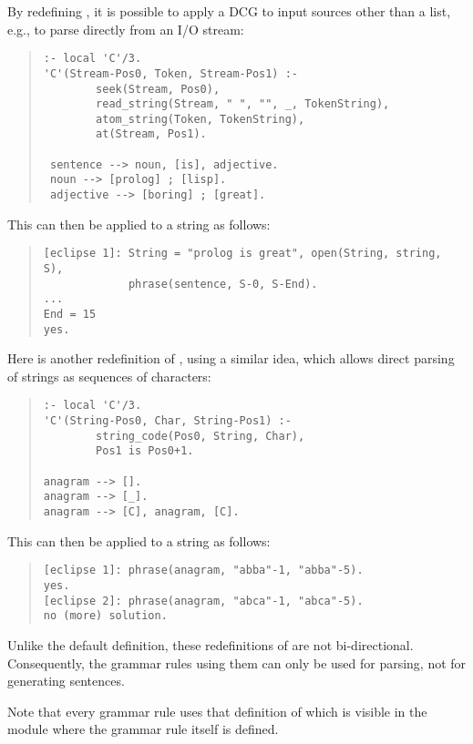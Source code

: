 By redefining , it is possible to apply a DCG to
input sources other than a list, e.g., to parse directly from an I/O stream:
\begin{quote}
\begin{verbatim}
:- local 'C'/3.
'C'(Stream-Pos0, Token, Stream-Pos1) :-
        seek(Stream, Pos0),
        read_string(Stream, " ", "", _, TokenString),
        atom_string(Token, TokenString),
        at(Stream, Pos1).

 sentence --> noun, [is], adjective.
 noun --> [prolog] ; [lisp].
 adjective --> [boring] ; [great].
\end{verbatim}
\end{quote}
This can then be applied to a string as follows:
\begin{quote}
\begin{verbatim}
[eclipse 1]: String = "prolog is great", open(String, string, S),
             phrase(sentence, S-0, S-End).
...
End = 15
yes.
\end{verbatim}
\end{quote}
Here is another redefinition of , using a similar idea, which
allows  direct parsing of {\eclipse} strings as sequences of characters:
\begin{quote}
\begin{verbatim}
:- local 'C'/3.
'C'(String-Pos0, Char, String-Pos1) :-
        string_code(Pos0, String, Char),
        Pos1 is Pos0+1.

anagram --> [].
anagram --> [_].
anagram --> [C], anagram, [C].
\end{verbatim}
\end{quote}
This can then be applied to a string as follows:
\begin{quote}
\begin{verbatim}
[eclipse 1]: phrase(anagram, "abba"-1, "abba"-5).
yes.
[eclipse 2]: phrase(anagram, "abca"-1, "abca"-5).
no (more) solution.
\end{verbatim}
\end{quote}
Unlike the default definition, these redefinitions of  are not
bi-directional.
Consequently, the grammar rules using them can only be used for parsing,
not for generating sentences.

Note that every grammar rule uses that definition of  which is
visible in
the module where the grammar rule itself is defined.

